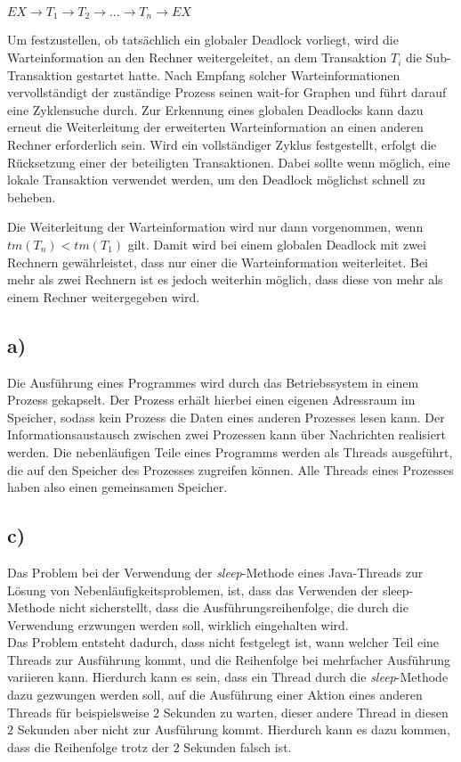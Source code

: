\documentclass[ngerman]{fbi-aufgabenblatt}
\begin{document}
$EX \rightarrow T_{1} \rightarrow T_{2} \rightarrow ... \rightarrow T_{n} \rightarrow EX$

Um festzustellen, ob tatsächlich ein globaler Deadlock vorliegt, wird die Warteinformation an den Rechner weitergeleitet, an dem Transaktion $T_{i}$ die Sub-Transaktion gestartet hatte. Nach Empfang solcher Warteinformationen vervollständigt der zuständige Prozess seinen wait-for Graphen und führt darauf eine Zyklensuche durch. Zur Erkennung eines globalen Deadlocks kann dazu erneut die Weiterleitung der erweiterten Warteinformation an einen anderen Rechner erforderlich sein. Wird ein vollständiger Zyklus festgestellt, erfolgt die Rücksetzung einer der beteiligten Transaktionen. Dabei sollte wenn möglich, eine lokale Transaktion verwendet werden, um den Deadlock möglichst schnell zu beheben.

Die Weiterleitung der Warteinformation wird nur dann vorgenommen, wenn 
$tm (T_{n}) < tm (T_{1})$ gilt. Damit wird bei einem globalen Deadlock mit zwei Rechnern gewährleistet, dass nur einer die Warteinformation weiterleitet. Bei mehr als zwei Rechnern ist es jedoch weiterhin möglich, dass diese von mehr als einem Rechner weitergegeben wird.


\subsection*{a)}
Die Ausführung eines Programmes wird durch das Betriebssystem in einem Prozess gekapselt. Der Prozess erhält hierbei einen eigenen Adressraum im Speicher, sodass kein Prozess die Daten eines anderen Prozesses lesen kann. Der Informationsaustausch zwischen zwei Prozessen kann über Nachrichten realisiert werden. Die nebenläufigen Teile eines Programms werden als Threads ausgeführt, die auf den Speicher des Prozesses zugreifen können. Alle Threads eines Prozesses haben also einen gemeinsamen Speicher.

\subsection*{c)}
Das Problem bei der Verwendung der \textit{sleep}-Methode eines Java-Threads zur Lösung von Nebenläufigkeitsproblemen, ist, dass das Verwenden der {sleep}-Methode nicht sicherstellt, dass die Ausführungsreihenfolge, die durch die Verwendung erzwungen werden soll, wirklich eingehalten wird. \\

Das Problem entsteht dadurch, dass nicht festgelegt ist, wann welcher Teil eine Threads zur Ausführung kommt, und die Reihenfolge bei mehrfacher Ausführung variieren kann. Hierdurch kann es sein, dass ein Thread durch die \textit{sleep}-Methode dazu gezwungen werden soll, auf die Ausführung einer Aktion eines anderen Threads für beispielsweise $2$ Sekunden zu warten, dieser andere Thread in diesen $2$ Sekunden aber nicht zur Ausführung kommt. Hierdurch kann es dazu kommen, dass die Reihenfolge trotz der $2$ Sekunden falsch ist.
\end{document}
